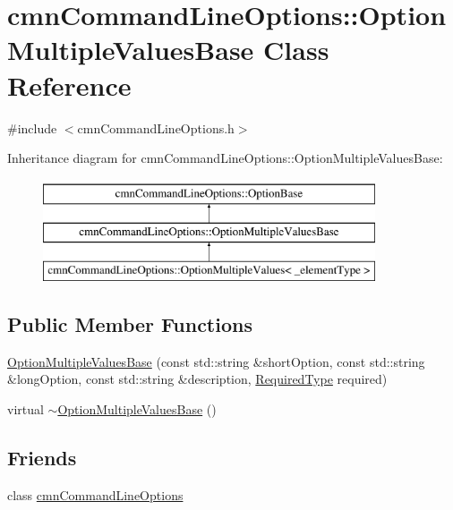 \hypertarget{classcmn_command_line_options_1_1_option_multiple_values_base}{\section{cmn\-Command\-Line\-Options\-:\-:Option\-Multiple\-Values\-Base Class Reference}
\label{classcmn_command_line_options_1_1_option_multiple_values_base}
}


{\ttfamily \#include $<$cmn\-Command\-Line\-Options.\-h$>$}

Inheritance diagram for cmn\-Command\-Line\-Options\-:\-:Option\-Multiple\-Values\-Base\-:\begin{figure}[H]
\begin{center}
\leavevmode
\includegraphics[height=3.000000cm]{d3/dd8/classcmn_command_line_options_1_1_option_multiple_values_base}
\end{center}
\end{figure}
\subsection*{Public Member Functions}
\begin{DoxyCompactItemize}
\item 
\hyperlink{classcmn_command_line_options_1_1_option_multiple_values_base_a54b498f115dfee799f9d3bd762182b15}{Option\-Multiple\-Values\-Base} (const std\-::string \&short\-Option, const std\-::string \&long\-Option, const std\-::string \&description, \hyperlink{classcmn_command_line_options_ac239a3ca62dd4e3b391824f6f1a97c76}{Required\-Type} required)
\item 
virtual \hyperlink{classcmn_command_line_options_1_1_option_multiple_values_base_af00362fe6ac89a03d9ffb3ac3fce84c3}{$\sim$\-Option\-Multiple\-Values\-Base} ()
\end{DoxyCompactItemize}
\subsection*{Friends}
\begin{DoxyCompactItemize}
\item 
class \hyperlink{classcmn_command_line_options_1_1_option_multiple_values_base_a18923f23ed3914806f1edf878a64b422}{cmn\-Command\-Line\-Options}
\end{DoxyCompactItemize}
